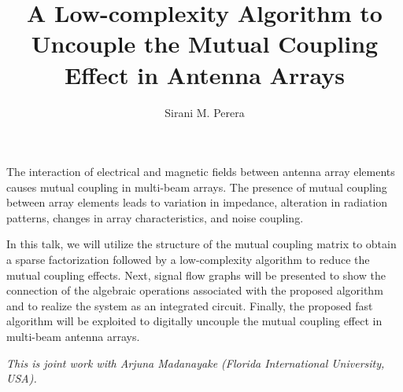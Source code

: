 \documentclass[a4paper]{amsart}
\date{}
\begin{document}
\title{A Low-complexity Algorithm to Uncouple the Mutual Coupling Effect in Antenna Arrays}
\author{Sirani M. Perera} %
\address{Embry-Riddle Aeronautical University, USA} %

\maketitle


The interaction of electrical and magnetic fields between antenna array elements causes mutual coupling in multi-beam arrays. The presence of mutual coupling between array elements leads to variation in impedance, alteration in radiation patterns, changes in array characteristics, and noise coupling. 

In this talk, we will utilize the structure of the mutual coupling matrix to obtain a sparse factorization followed by a low-complexity algorithm to reduce the mutual coupling effects. Next, signal flow graphs will be presented to show the connection of the algebraic operations associated with the proposed algorithm and to realize the system as an integrated circuit. Finally, the proposed fast algorithm will be exploited to digitally uncouple the mutual coupling effect in multi-beam antenna arrays. 

\emph{This is joint work with Arjuna Madanayake (Florida International University, USA).}


\end{document}
